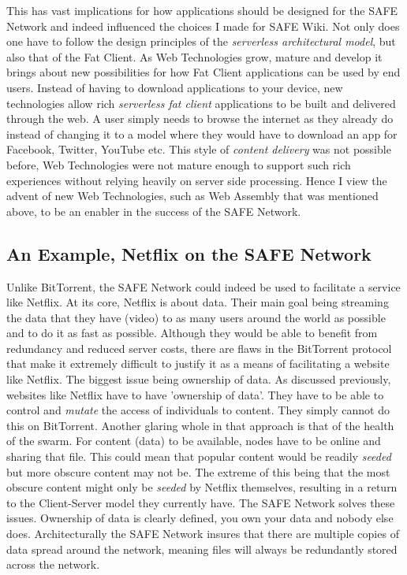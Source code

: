 This has vast implications for how applications should be designed for the SAFE Network and indeed influenced the choices I made for SAFE Wiki. Not only does one have to follow the design principles of the \textit{serverless architectural model}, but also that of the Fat Client. As Web Technologies grow, mature and develop it brings about new possibilities for how Fat Client applications can be used by end users. Instead of having to download applications to your device, new technologies allow rich \textit{serverless fat client} applications to be built and delivered through the web. A user simply needs to browse the internet as they already do instead of changing it to a model where they would have to download an app for Facebook, Twitter, YouTube etc. This style of \textit{content delivery} was not possible before, Web Technologies were not mature enough to support such rich experiences without relying heavily on server side processing. Hence I view the advent of new Web Technologies, such as Web Assembly that was mentioned above, to be an enabler in the success of the SAFE Network.

\subsection{An Example, Netflix on the SAFE Network}

Unlike BitTorrent, the SAFE Network could indeed be used to facilitate a service like Netflix. At its core, Netflix is about data. Their main goal being streaming the data that they have (video) to as many users around the world as possible and to do it as fast as possible. Although they would be able to benefit from redundancy and reduced server costs, there are flaws in the BitTorrent protocol that make it extremely difficult to justify it as a means of facilitating a website like Netflix. The biggest issue being ownership of data. As discussed previously, websites like Netflix have to have 'ownership of data'. They have to be able to control and \textit{mutate} the access of individuals to content. They simply cannot do this on BitTorrent. Another glaring whole in that approach is that of the health of the swarm. For content (data) to be available, nodes have to be online and sharing that file. This could mean that popular content would be readily \textit{seeded} but more obscure content may not be. The extreme of this being that the most obscure content might only be \textit{seeded} by Netflix themselves, resulting in a return to the Client-Server model they currently have. The SAFE Network solves these issues. Ownership of data is clearly defined, you own your data and nobody else does. Architecturally the SAFE Network insures that there are multiple copies of data spread around the network, meaning files will always be redundantly stored across the network. 

